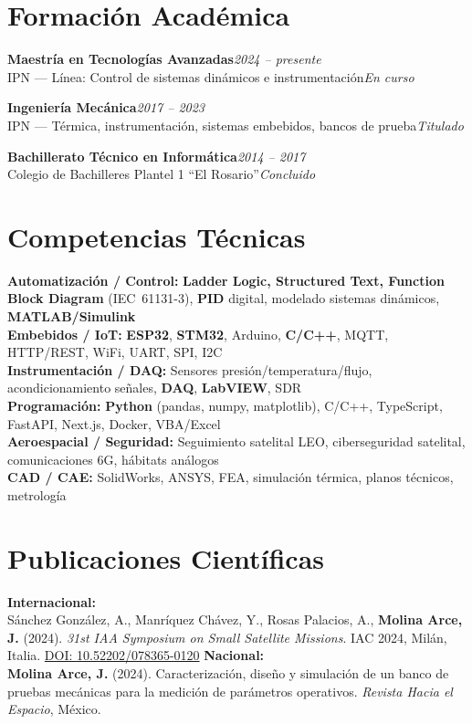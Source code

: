 \documentclass[10pt, letterpaper]{article}
\newcommand{\cvedu}[4]{%
  \vspace{1pt}%
  {\color{azuloscuro}\textbf{#1}}\hfill{\small\color{gristexto}\textit{#2}}\\[-3pt]
  {\small\color{gristexto}#3}\hfill{\small\color{azulmedio}\textit{#4}}%
  \vspace{1pt}%
}
\newcommand{\skillcat}[2]{%
  \textbf{\color{azuloscuro}#1:} {\small\color{gristexto}#2}\\[0.8pt]%
}
\begin{document}
\section{Formación Académica}

\cvedu{Maestría en Tecnologías Avanzadas}{2024 – presente}{IPN — Línea: Control de sistemas dinámicos e instrumentación}{En curso}
\vspace{2pt}
\cvedu{Ingeniería Mecánica}{2017 – 2023}{IPN — Térmica, instrumentación, sistemas embebidos, bancos de prueba}{Titulado}
\vspace{2pt}
\cvedu{Bachillerato Técnico en Informática}{2014 – 2017}{Colegio de Bachilleres Plantel 1 ``El Rosario''}{Concluido}

\section{Competencias Técnicas}

{\small
\skillcat{Automatización / Control}{\textbf{Ladder Logic, Structured Text, Function Block Diagram} (IEC~61131-3), \textbf{PID} digital, modelado sistemas dinámicos, \textbf{MATLAB/Simulink}}
\skillcat{Embebidos / IoT}{\textbf{ESP32}, \textbf{STM32}, Arduino, \textbf{C/C++}, MQTT, HTTP/REST, WiFi, UART, SPI, I2C}
\skillcat{Instrumentación / DAQ}{Sensores presión/temperatura/flujo, acondicionamiento señales, \textbf{DAQ}, \textbf{LabVIEW}, SDR}
\skillcat{Programación}{\textbf{Python} (pandas, numpy, matplotlib), C/C++, TypeScript, FastAPI, Next.js, Docker, VBA/Excel}
\skillcat{Aeroespacial / Seguridad}{Seguimiento satelital LEO, ciberseguridad satelital, comunicaciones 6G, hábitats análogos}
\skillcat{CAD / CAE}{SolidWorks, ANSYS, FEA, simulación térmica, planos técnicos, metrología}
}

\section{Publicaciones Científicas}

{\small\color{gristexto}
\textbf{Internacional:}\\
Sánchez González, A., Manríquez Chávez, Y., Rosas Palacios, A., \textbf{Molina Arce, J.} (2024). \textit{31st IAA Symposium on Small Satellite Missions}. IAC 2024, Milán, Italia.
\href{https://doi.org/10.52202/078365-0120}{DOI: 10.52202/078365-0120}
\vspace{2pt}
\textbf{Nacional:}\\
\textbf{Molina Arce, J.} (2024). Caracterizaci\'{o}n, dise\~{n}o y simulaci\'{o}n de un banco de pruebas mec\'{a}nicas para la medici\'{o}n de par\'{a}metros operativos. \textit{Revista Hacia el Espacio}, M\'{e}xico.
}
\end{document}
